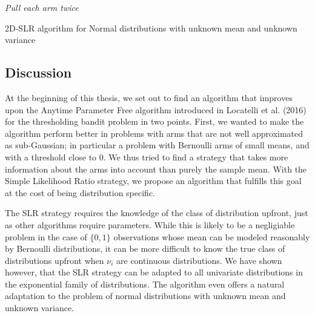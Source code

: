 \documentclass[11pt,]{article}
\begin{document}
\begin{algorithm}
\BlankLine
\emph{Pull each arm twice}\;
\caption{2D-SLR algorithm for Normal distributions with unknown mean and unknown variance}\label{algo_slr_2d}
\end{algorithm}

\DecMargin{1em}

\subsection{Discussion}\label{discussion-1}

At the beginning of this thesis, we set out to find an algorithm that
improves upon the Anytime Parameter Free algorithm introduced in
Locatelli et al. (2016) for the thresholding bandit problem in two
points. First, we wanted to make the algorithm perform better in
problems with arms that are not well approximated as sub-Gaussian; in
particular a problem with Bernoulli arms of small means, and with a
threshold close to 0. We thus tried to find a strategy that takes more
information about the arms into account than purely the sample mean.
With the Simple Likelihood Ratio strategy, we propose an algorithm that
fulfills this goal at the cost of being distribution specific.

The SLR strategy requires the knowledge of the class of distribution
upfront, just as other algorithms require parameters. While this is
likely to be a negligiable problem in the case of \(\{0,1\}\)
observations whose mean can be modeled reasonably by Bernoulli
distributions, it can be more difficult to know the true class of
distributions upfront when \(\nu_i\) are continuous distributions. We
have shown however, that the SLR strategy can be adapted to all
univariate distributions in the exponential family of distributions. The
algorithm even offers a natural adaptation to the problem of normal
distributions with unknown mean and unknown variance.
\end{document}

